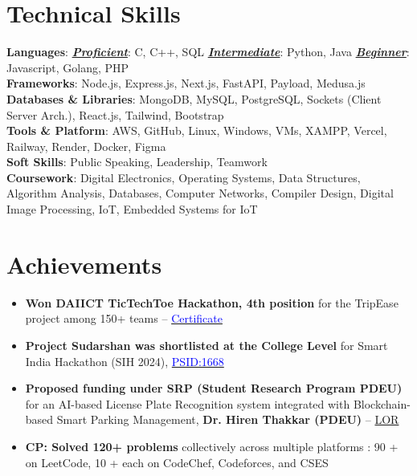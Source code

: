 \documentclass[letterpaper,11pt]{article}
\newcommand{\resumeItem}[1]{
  \item\small{
    {#1 \vspace{-2pt}}
  }
}
\newcommand{\resumeItemListStart}{\begin{itemize}}
\newcommand{\resumeItemListEnd}{\end{itemize}\vspace{-5pt}}
\begin{document}
\section{\textbf{Technical Skills}}
 \begin{itemize}[leftmargin=0.15in, label={}]
 \vspace{-3pt}
    \small{\item{
     \textbf{Languages}{: \textbf{\underline{\textit{Proficient}}}: C, C++, SQL \textbf{\underline{\textit{Intermediate}}}: Python, Java \textbf{\underline{\textit{Beginner}}}: Javascript, Golang, PHP} \\
     \vspace{0.5mm}
     \textbf{Frameworks}{:  Node.js, Express.js, Next.js, FastAPI, Payload, Medusa.js} \\
     \vspace{0.5mm}
      \textbf{Databases \& Libraries}{: MongoDB, MySQL, PostgreSQL, Sockets (Client Server Arch.), React.js, Tailwind, Bootstrap} \\
     \vspace{0.5mm}
     \textbf{Tools \& Platform}{: AWS, GitHub, Linux, Windows, VMs, XAMPP, Vercel, Railway, Render, Docker, Figma} \\
         \textbf{Soft Skills}{: Public Speaking, Leadership, Teamwork} \\
     \textbf{Coursework}{: Digital Electronics, Operating Systems, Data Structures, Algorithm Analysis, Databases, Computer Networks, Compiler Design, Digital Image Processing, IoT, Embedded Systems for IoT} }}
 \end{itemize}
   \vspace{-19pt}

\section{\textbf{Achievements}}
\resumeItemListStart
\vspace{-3pt}
  \resumeItem{\textbf{Won DAIICT TicTechToe Hackathon, 4th position} for the TripEase project among 150+ teams – 
  \href{https://drive.usercontent.google.com/download?id=1b13F12dj3XKOmYaeIuE_BZfGoEfj6ogH&authuser=0}{\textcolor{blue}{Certificate}}}
  
  \resumeItem{\textbf{Project Sudarshan was shortlisted at the College Level} for Smart India Hackathon (SIH 2024), 
  \href{https://drive.usercontent.google.com/download?id=1wTAfgS5TMOPHQgIEbATFiR-whlNGGKKr&authuser=0}{\textcolor{blue}{PSID:1668}}}

  \resumeItem{\textbf{Proposed funding under SRP (Student Research Program PDEU)} for an AI-based License Plate Recognition system integrated with Blockchain-based Smart Parking Management, \textbf{Dr. Hiren Thakkar (PDEU)} -- {\textcolor{blue}{\href{LOR Link}{LOR}}}}

  \resumeItem{\textbf{CP: Solved 120+ problems} collectively across multiple platforms :
  90 + on LeetCode, 10 + each on CodeChef, Codeforces, and CSES}

\resumeItemListEnd
  \vspace{-16pt}

\end{document}
